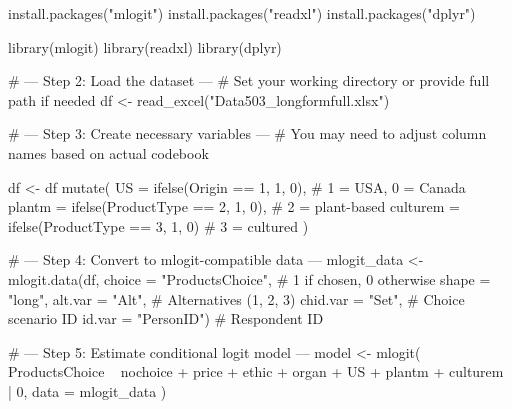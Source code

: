 install.packages("mlogit")
install.packages("readxl")
install.packages("dplyr")

library(mlogit)
library(readxl)
library(dplyr)

# --- Step 2: Load the dataset ---
# Set your working directory or provide full path if needed
df <- read_excel("Data503_longformfull.xlsx")

# --- Step 3: Create necessary variables ---
# You may need to adjust column names based on actual codebook

df <- df %
  mutate(
    US = ifelse(Origin == 1, 1, 0),                   # 1 = USA, 0 = Canada
    plantm = ifelse(ProductType == 2, 1, 0),          # 2 = plant-based
    culturem = ifelse(ProductType == 3, 1, 0)         # 3 = cultured
  )

# --- Step 4: Convert to mlogit-compatible data ---
mlogit_data <- mlogit.data(df,
                           choice = "ProductsChoice",   # 1 if chosen, 0 otherwise
                           shape = "long",
                           alt.var = "Alt",             # Alternatives (1, 2, 3)
                           chid.var = "Set",            # Choice scenario ID
                           id.var = "PersonID")         # Respondent ID

# --- Step 5: Estimate conditional logit model ---
model <- mlogit(
  ProductsChoice ~ nochoice + price + ethic + organ + US + plantm + culturem | 0,
  data = mlogit_data
)